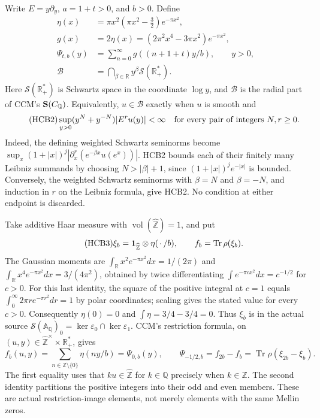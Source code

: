 Write $E=y\partial_y$, $a=1+t>0$, and $b>0$. Define
\begin{equation}\tag{HCB1}
\begin{split}
 \eta(x)&=\pi x^2(\pi x^2-\tfrac32)e^{-\pi x^2},\\
 g(x)&=2\eta(x)=(2\pi^2x^4-3\pi x^2)e^{-\pi x^2},\\
 \Psi_{t,b}(y)&=\sum_{n=0}^{\infty}g((n+1+t)y/b),\qquad y>0,\\
 \mathcal B&=\bigcap_{\beta\in\mathbb R}y^\beta
                 \mathcal S(\mathbb R_+^*).
\end{split}
\end{equation}
Here $\mathcal S(\mathbb R_+^*)$ is Schwartz space in the coordinate
$\log y$, and $\mathcal B$ is the radial part of CCM's
${\bf S}(C_{\mathbb Q})$. Equivalently, $u\in\mathcal B$ exactly when
$u$ is smooth and
\begin{equation}\tag{HCB2}
 \sup_{y>0}(y^N+y^{-N})|E^r u(y)|<\infty
 \quad\hbox{for every pair of integers }N,r\geq0.
\end{equation}
Indeed, the defining weighted Schwartz seminorms become
$\sup_x(1+|x|)^j|\partial_x^r(e^{-\beta x}u(e^x))|$.
HCB2 bounds each of their finitely many Leibniz summands by choosing
$N>|\beta|+1$, since $(1+|x|)^j e^{-|x|}$ is bounded. Conversely,
the weighted Schwartz seminorms with $\beta=N$ and $\beta=-N$, and
induction in $r$ on the Leibniz formula, give HCB2. No condition at
either endpoint is discarded.

Take additive Haar measure with $\operatorname{vol}(\widehat{\mathbb
Z})=1$, and put
\begin{equation}\tag{HCB3}
 \xi_b={\bf1}_{\widehat{\mathbb Z}}\otimes\eta(\,\cdot\,/b),
 \qquad f_b=\operatorname{Tr}\rho(\xi_b).
\end{equation}
The Gaussian moments are
$\int_{\mathbb R}x^2e^{-\pi x^2}dx=1/(2\pi)$ and
$\int_{\mathbb R}x^4e^{-\pi x^2}dx=3/(4\pi^2)$, obtained by
twice differentiating $\int e^{-\pi c x^2}dx=c^{-1/2}$ for $c>0$.
For this last identity, the square of the positive integral at
$c=1$ equals $\int_0^\infty 2\pi r e^{-\pi r^2}dr=1$ by polar
coordinates; scaling gives the stated value for every $c>0$.
Consequently $\eta(0)=0$ and $\int\eta=3/4-3/4=0$.
Thus $\xi_b$ is in the actual source
$\mathcal S(\mathbb A_{\mathbb Q})_0=\ker\varepsilon_0\cap
\ker\varepsilon_1$. CCM's restriction formula, on
$(u,y)\in\widehat{\mathbb Z}^{\times}\times\mathbb R_+^*$, gives
\begin{equation}\tag{HCB4}
 f_b(u,y)=\sum_{n\in\mathbb Z\setminus\{0\}}\eta(ny/b)
       =\Psi_{0,b}(y),\qquad
 \Psi_{-1/2,b}=f_{2b}-f_b
       =\operatorname{Tr}\rho(\xi_{2b}-\xi_b).
\end{equation}
The first equality uses that $ku\in\widehat{\mathbb Z}$ for
$k\in\mathbb Q$ precisely when $k\in\mathbb Z$. The second identity
partitions the positive integers into their odd and even members.
These are actual restriction-image elements, not merely elements
with the same Mellin zeros.

